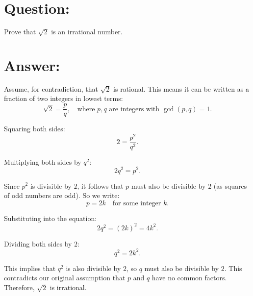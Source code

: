 \documentclass{article}
\begin{document}
\section{Question:}

Prove that $\sqrt{2}$ is an irrational number.

\section{Answer:}

Assume, for contradiction, that $\sqrt{2}$ is rational. This means it can be written as a fraction of two integers in lowest terms:
\begin{equation}
    \sqrt{2} = \frac{p}{q}, \quad \text{where } p, q \text{ are integers with } \gcd(p, q) = 1.
\end{equation}

Squaring both sides:
\begin{equation}
    2 = \frac{p^2}{q^2}.
\end{equation}

Multiplying both sides by $q^2$:
\begin{equation}
    2q^2 = p^2.
\end{equation}

Since $p^2$ is divisible by $2$, it follows that $p$ must also be divisible by $2$ (as squares of odd numbers are odd). So we write:
\begin{equation}
    p = 2k \quad \text{for some integer } k.
\end{equation}

Substituting into the equation:
\begin{equation}
    2q^2 = (2k)^2 = 4k^2.
\end{equation}

Dividing both sides by $2$:
\begin{equation}
    q^2 = 2k^2.
\end{equation}

This implies that $q^2$ is also divisible by $2$, so $q$ must also be divisible by $2$. This contradicts our original assumption that $p$ and $q$ have no common factors. Therefore, $\sqrt{2}$ is irrational.
\end{document}
